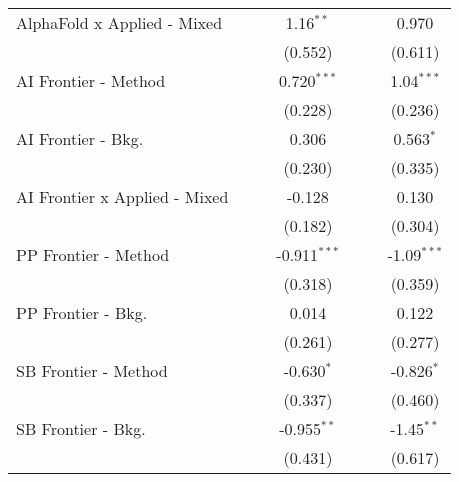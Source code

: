 \begin{tabular}{lcccccc}
   AlphaFold x Applied - Mixed   &               &             & 1.16$^{**}$    &               &              & 0.970\\   
                                 &               &             & (0.552)        &               &              & (0.611)\\   
   AI Frontier - Method          &               &             & 0.720$^{***}$  &               &              & 1.04$^{***}$\\   
                                 &               &             & (0.228)        &               &              & (0.236)\\   
   AI Frontier - Bkg.            &               &             & 0.306          &               &              & 0.563$^{*}$\\   
                                 &               &             & (0.230)        &               &              & (0.335)\\   
   AI Frontier x Applied - Mixed &               &             & -0.128         &               &              & 0.130\\   
                                 &               &             & (0.182)        &               &              & (0.304)\\   
   PP Frontier - Method          &               &             & -0.911$^{***}$ &               &              & -1.09$^{***}$\\   
                                 &               &             & (0.318)        &               &              & (0.359)\\   
   PP Frontier - Bkg.            &               &             & 0.014          &               &              & 0.122\\   
                                 &               &             & (0.261)        &               &              & (0.277)\\   
   SB Frontier - Method          &               &             & -0.630$^{*}$   &               &              & -0.826$^{*}$\\   
                                 &               &             & (0.337)        &               &              & (0.460)\\   
   SB Frontier - Bkg.            &               &             & -0.955$^{**}$  &               &              & -1.45$^{**}$\\   
                                 &               &             & (0.431)        &               &              & (0.617)\\   

\end{tabular}
